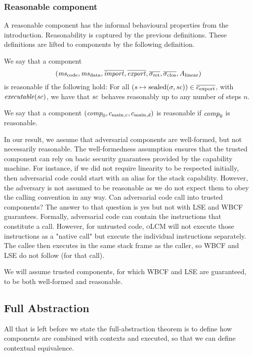 \documentclass[acmsmall,screen]{acmart}\settopmatter{}
\newcommand{\srccm}{\textsc{oLCM}}
\newenvironment{jversion}%
    {\color{OliveGreen}}{}
\begin{document}
\begin{jversion}
  \subsubsection{Reasonable component}
  A reasonable component has the informal behavioural properties from the introduction.
  Reasonability is captured by the previous definitions. These definitions are lifted to components by the following definition.
  \begin{definition}
    \label{def:reasonable-component}
    We say that a component
    \[
      (\mscode,\msdata,\overline{\var{import}},\overline{\var{export}},\sigrets,\sigcloss,A_\linear)
    \]
    is reasonable if the following hold: For all $(s \mapsto \mathrm{sealed}(\sigma,\mathit{sc})) \in
    \overline{c_{\mathrm{export}}}$, with $\exec{\vsc}$, we have that $\mathit{sc}$
    behaves reasonably up to any number of steps $n$.

    We say that a component
    $(\mathit{comp}_0,c_{\mathrm{main},c}, c_{\mathrm{main},d})$ is reasonable if $\mathit{comp}_0$ is reasonable.
  \end{definition}
\end{jversion}

In our result, we assume that adversarial components are well-formed, but not necessarily reasonable. The well-formedness assumption ensures
that the trusted component can rely on basic security guarantees provided by the capability machine. For instance, if we did not require linearity to be respected initially, then adversarial code could start with an alias for the stack capability.
However, the adversary is not assumed to be reasonable as we do not expect them to obey the calling convention in any way.
Can adversarial code call into trusted components?
The answer to that question is yes but not with LSE and WBCF guarantees.
Formally, adversarial code can contain the instructions that constitute a call.
However, for untrusted code, \srccm{} will not execute those instructions as a "native call" but execute the individual instructions separately.
The callee then executes in the same stack frame as the caller, so WBCF and LSE do not follow (for that call).

We will assume trusted components, for which WBCF and LSE are guaranteed, to be both well-formed and reasonable. 

\subsection{Full Abstraction}
All that is left before we state the full-abstraction theorem is to define how components are combined with contexts and executed, so that we can define contextual equivalence.
\end{document}
